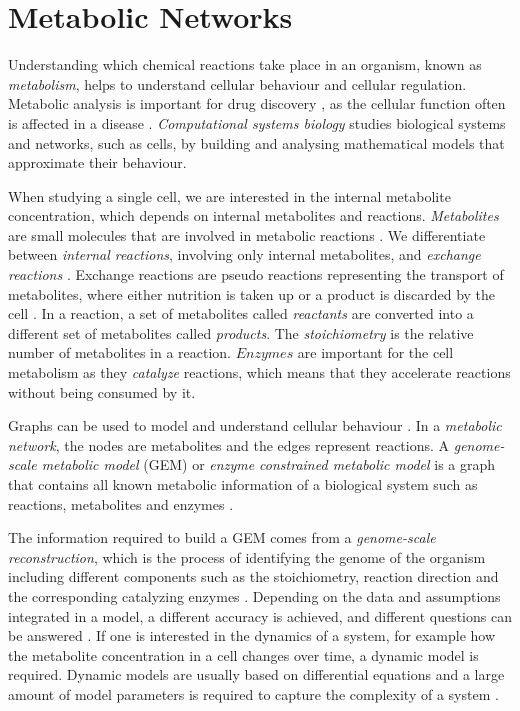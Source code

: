 \section{Metabolic Networks} \label{section:metabolic_networks}
Understanding which chemical reactions take place in an organism, known as \textit{metabolism},  helps to understand cellular behaviour and cellular regulation. Metabolic analysis is important for drug discovery , as the cellular function often is affected in a disease \cite{fba_applications_and_challenges}.
\textit{Computational systems biology} studies biological systems and networks, such as cells, by building and analysing mathematical models that approximate their behaviour. 

When studying a single cell, we are interested in the internal metabolite concentration, which depends on internal metabolites and reactions. \textit{Metabolites} are small molecules that are involved in metabolic reactions \cite{intro_computational_systems_biology}. We differentiate between \textit{internal reactions}, involving only internal metabolites, and \textit{exchange reactions} %
. Exchange reactions are pseudo reactions representing the transport of metabolites, where either nutrition is taken up or a product is discarded by the cell \cite{fba_applications_and_challenges}. 
In a reaction, a set of metabolites called \textit{reactants} are converted into a different set of metabolites called \textit{products}. The \textit{stoichiometry} is the relative number of metabolites in a reaction. $Enzymes$ are important for the cell metabolism as they \textit{catalyze} reactions, which means that they accelerate reactions without being consumed by it.

Graphs can be used to model and understand cellular behaviour \cite{intro_computational_systems_biology}.
In a \textit{metabolic network}, the nodes are metabolites %
and the edges represent reactions. 
A \textit{genome-scale metabolic model} (GEM) or \textit{enzyme constrained metabolic model} is a graph that contains all known metabolic information of a biological system such as reactions, metabolites and enzymes \cite{GEMs}. 

The information required to build a GEM comes from a \textit{genome-scale reconstruction}, which is the process of identifying the genome of the organism including different components such as the stoichiometry, reaction direction and the corresponding catalyzing enzymes \cite{fba_applications_and_challenges} . 
Depending on the data and assumptions integrated in a model, a different accuracy is achieved, and different questions can be answered \cite{fba_applications_and_challenges}. 
If one is interested in the dynamics of a system, for example how the metabolite concentration in a cell changes over time, a dynamic model is required. Dynamic models are usually based on differential equations and a large amount of model parameters is required to capture the complexity of a system \cite{intro_computational_systems_biology}.

